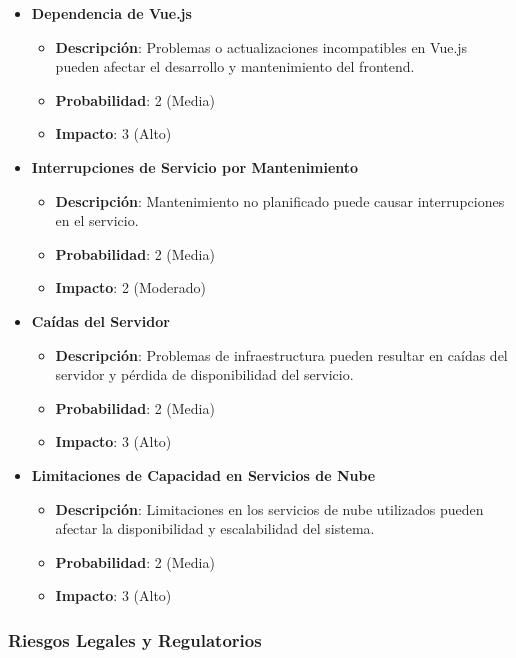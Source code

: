 \begin{itemize}
    \item \textbf{Dependencia de Vue.js}
          \begin{itemize}
              \item \textbf{Descripción}: Problemas o actualizaciones incompatibles en Vue.js pueden afectar el desarrollo y mantenimiento del frontend.
              \item \textbf{Probabilidad}: 2 (Media)
              \item \textbf{Impacto}: 3 (Alto)
          \end{itemize}

    \item \textbf{Interrupciones de Servicio por Mantenimiento}
          \begin{itemize}
              \item \textbf{Descripción}: Mantenimiento no planificado puede causar interrupciones en el servicio.
              \item \textbf{Probabilidad}: 2 (Media)
              \item \textbf{Impacto}: 2 (Moderado)
          \end{itemize}

    \item \textbf{Caídas del Servidor}
          \begin{itemize}
              \item \textbf{Descripción}: Problemas de infraestructura pueden resultar en caídas del servidor y pérdida de disponibilidad del servicio.
              \item \textbf{Probabilidad}: 2 (Media)
              \item \textbf{Impacto}: 3 (Alto)
          \end{itemize}

    \item \textbf{Limitaciones de Capacidad en Servicios de Nube}
          \begin{itemize}
              \item \textbf{Descripción}: Limitaciones en los servicios de nube utilizados pueden afectar la disponibilidad y escalabilidad del sistema.
              \item \textbf{Probabilidad}: 2 (Media)
              \item \textbf{Impacto}: 3 (Alto)
          \end{itemize}
\end{itemize}

\subsubsection{Riesgos Legales y Regulatorios}

